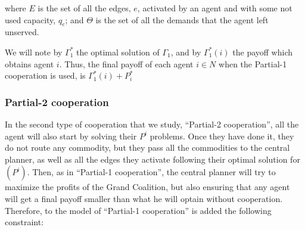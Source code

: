 \documentclass{article}
\begin{document}
where $E$ is the set of all the edges, $e$, activated by an agent and with some not used capacity, $q_e$; and 
$\Theta$ is the set of all the demands that the agent left unserved.

We will note by $\Gamma_1^*$ the optimal solution of  $\Gamma_1$, and by $\Gamma_1^*(i)$ the payoff which obtains
agent $i$. Thus, the final payoff
of each agent $i\in N$ when the Partial-1 cooperation is used, is $\Gamma_1^*(i)+P_i^*$


\subsubsection*{Partial-2 cooperation}

In the second type of cooperation that we study, ``Partial-2 cooperation'', all the agent will also start by solving
their $P^i$ problems. Once they have done it, they do not route any commodity, but they pass all the commodities to the central
planner, as well as all the edges they activate following their optimal solution for $(P^i)$. Then, as in ``Partial-1 cooperation'',
the central planner will try to maximize the profits of the Grand Coalition, but also ensuring that any agent will get a final payoff smaller
than what he will optain without cooperation. Therefore, to the model of ``Partial-1 cooperation'' is added the following constraint:
\end{document}
